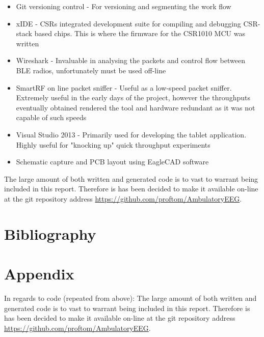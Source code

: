 \documentclass[]{article}
\begin{document}
\begin{itemize}
	\item Git versioning control - For versioning and segmenting the work flow
	\item xIDE - CSRs integrated development suite for compiling and debugging CSR-stack based chips. This is where the firmware for the CSR1010 MCU was written
	\item Wireshark - Invaluable in analysing the packets and control flow between BLE radios, unfortunately must be used off-line
	\item SmartRF on line packet sniffer - Useful as a low-speed packet sniffer. Extremely useful in the early days of the project, however the throughputs eventually obtained rendered the tool and hardware redundant as it was not capable of such speeds
	\item Visual Studio 2013 - Primarily used for developing the tablet application. Highly useful for "knocking up" quick throughput experiments 
	\item Schematic capture and \ac{PCB} layout using EagleCAD software
\end{itemize}

The large amount of both written and generated code is to vast to warrant being included in this report. Therefore is has been decided to make it available on-line at the git repository address 
\url{https://github.com/proftom/AmbulatoryEEG}.
\clearpage
\section{Bibliography}

\nocite{*}

\printbibliography

\section{Appendix}

In regards to code (repeated from above): The large amount of both written and generated code is to vast to warrant being included in this report. Therefore is has been decided to make it  available on-line at the git repository address 
\url{https://github.com/proftom/AmbulatoryEEG}.
\end{document}
